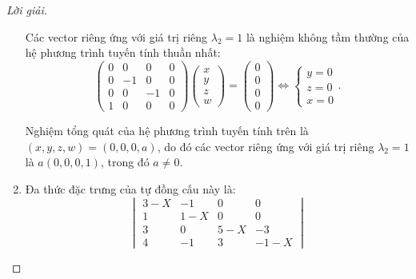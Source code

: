 \documentclass[class=linearalgebra,crop=false]{standalone}
\begin{document}
\begin{proof}[Lời giải]
\begin{enumerate}[label = (\alph*)]
              \bigskip
              \par Các vector riêng ứng với giá trị riêng $\lambda_{2} = 1$ là nghiệm không tầm thường của hệ phương trình tuyến tính thuần nhất:
              \[
                  \begin{pmatrix}
                      0 & 0  & 0  & 0 \\
                      0 & -1 & 0  & 0 \\
                      0 & 0  & -1 & 0 \\
                      1 & 0  & 0  & 0
                  \end{pmatrix}
                  \begin{pmatrix}
                      x \\
                      y \\
                      z \\
                      w
                  \end{pmatrix}
                  =
                  \begin{pmatrix}
                      0 \\
                      0 \\
                      0 \\
                      0
                  \end{pmatrix}
                  \Longleftrightarrow
                  \begin{cases}
                      y = 0 \\
                      z = 0 \\
                      x = 0
                  \end{cases}.
              \]
              \par Nghiệm tổng quát của hệ phương trình tuyến tính trên là $(x, y, z, w) = (0, 0, 0, a)$, do đó các vector riêng ứng với giá trị riêng $\lambda_{2} = 1$ là $a(0, 0, 0, 1)$, trong đó $a\ne 0$.
        \item Đa thức đặc trưng của tự đồng cấu này là:
              \[
                  \begin{vmatrix}
                      3 - X & -1    & 0     & 0      \\
                      1     & 1 - X & 0     & 0      \\
                      3     & 0     & 5 - X & -3     \\
                      4     & -1    & 3     & -1 - X
                  \end{vmatrix}
\]
\end{enumerate}
\end{proof}
\end{document}
